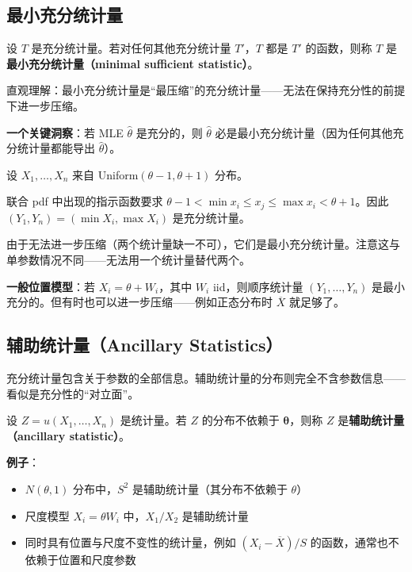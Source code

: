 \subsection{最小充分统计量}

\begin{definition}[最小充分统计量]\label{def:minimal-sufficient}
设 $T$ 是充分统计量。若对任何其他充分统计量 $T'$，$T$ 都是 $T'$ 的函数，则称 $T$ 是\textbf{最小充分统计量（minimal sufficient statistic）}。
\end{definition}

直观理解：最小充分统计量是``最压缩''的充分统计量——无法在保持充分性的前提下进一步压缩。

\textbf{一个关键洞察}：若 MLE $\hat{\theta}$ 是充分的，则 $\hat{\theta}$ 必是最小充分统计量（因为任何其他充分统计量都能导出 $\hat{\theta}$）。

\begin{example}\label{ex:uniform-location-minimal}
设 $X_1, \ldots, X_n$ 来自 Uniform$(\theta-1, \theta+1)$ 分布。

联合 pdf 中出现的指示函数要求 $\theta - 1 < \min x_i \leq x_j \leq \max x_i < \theta + 1$。因此 $(Y_1, Y_n) = (\min X_i, \max X_i)$ 是充分统计量。

由于无法进一步压缩（两个统计量缺一不可），它们是最小充分统计量。注意这与单参数情况不同——无法用一个统计量替代两个。
\end{example}

\textbf{一般位置模型}：若 $X_i = \theta + W_i$，其中 $W_i$ iid，则顺序统计量 $(Y_1, \ldots, Y_n)$ 是最小充分的。但有时也可以进一步压缩——例如正态分布时 $\overline{X}$ 就足够了。

\subsection{辅助统计量（Ancillary Statistics）}

充分统计量包含关于参数的全部信息。辅助统计量的分布则完全不含参数信息——看似是充分性的``对立面''。

\begin{definition}[辅助统计量]\label{def:ancillary}
设 $Z = u(X_1, \ldots, X_n)$ 是统计量。若 $Z$ 的分布不依赖于 $\boldsymbol{\theta}$，则称 $Z$ 是\textbf{辅助统计量（ancillary statistic）}。
\end{definition}

\textbf{例子}：
\begin{itemize}
\item $N(\theta, 1)$ 分布中，$S^2$ 是辅助统计量（其分布不依赖于 $\theta$）
\item 尺度模型 $X_i = \theta W_i$ 中，$X_1/X_2$ 是辅助统计量
\item 同时具有位置与尺度不变性的统计量，例如 $(X_i-\overline{X})/S$ 的函数，通常也不依赖于位置和尺度参数
\end{itemize}

